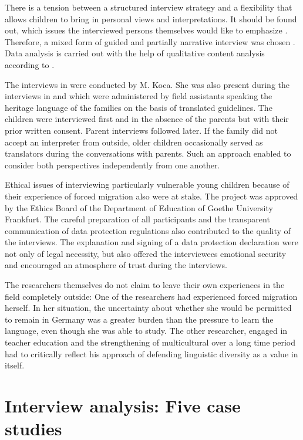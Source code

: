 \documentclass[output=paper,colorlinks,citecolor=brown]{langscibook}
\begin{document}
There is a tension between a structured interview strategy and a flexibility that allows children to bring in personal views and interpretations. It should be found out, which issues the interviewed persons themselves would like to emphasize \citep{delfos2008}. Therefore, a mixed form of guided and partially narrative interview was chosen \citep{helfferich2009,delfos2008}. Data analysis is carried out with the help of qualitative content analysis according to \citet{mayring2010}.

The interviews in  were conducted by M. Koca. She was also present during the interviews in  and  which were administered by field assistants speaking the heritage language of the families on the basis of translated guidelines. The children were interviewed first and in the absence of the parents but with their prior written consent. Parent interviews followed later. If the family did not accept an interpreter from outside, older children occasionally served as translators during the conversations with parents. Such an approach enabled to consider both perspectives independently from one another.

Ethical issues of interviewing particularly vulnerable young children because of their experience of forced migration also were at stake. The project was approved by the Ethics Board of the Department of Education of Goethe University Frankfurt. The careful preparation of all participants and the transparent communication of data protection regulations also contributed to the quality of the interviews. The explanation and signing of a data protection declaration were not only of legal necessity, but also offered the interviewees emotional security and encouraged an atmosphere of trust during the interviews.

The researchers themselves do not claim to leave their own experiences in the field completely outside: One of the researchers had experienced forced migration herself. In her situation, the uncertainty about whether she would be permitted to remain in Germany was a greater burden than the pressure to learn the language, even though she was able to study. The other researcher, engaged in teacher education and the strengthening of multicultural  over a long time period had to critically reflect his approach of defending linguistic diversity as a value in itself.

\section{Interview analysis: Five case studies}\label{ch2.5.ss.4}
\end{document}
